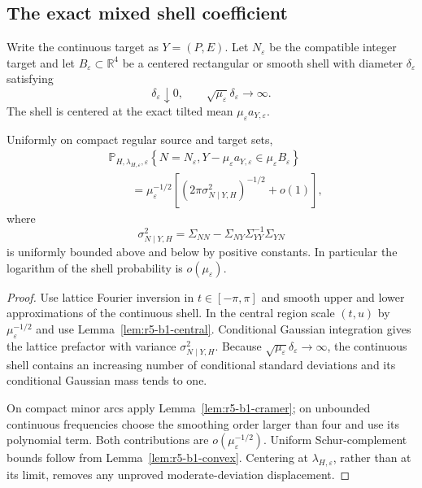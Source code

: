 \subsection{The exact mixed shell coefficient}

Write the continuous target as
\(Y=(P,E)\).  Let \(N_\varepsilon\) be the compatible integer target and let
\(B_\varepsilon\subset\mathbb R^4\) be a centered rectangular or smooth shell
with diameter \(\delta_\varepsilon\) satisfying
\[
 \delta_\varepsilon\downarrow0,
 \qquad \sqrt{\mu_\varepsilon}\delta_\varepsilon\to\infty.
\]
The shell is centered at the exact tilted mean
\(\mu_\varepsilon a_{Y,\varepsilon}\).

\begin{theorem}
\label{thm:r5-b1-coefficient}
Uniformly on compact regular source and target sets,
\[
 \begin{aligned}
 &\mathbb P_{H,\lambda_{H,\varepsilon},\varepsilon}
 \left\{
  N=N_\varepsilon,
  Y-\mu_\varepsilon a_{Y,\varepsilon}\in
  \mu_\varepsilon B_\varepsilon
 \right\}\\
 &\qquad=
 \mu_\varepsilon^{-1/2}
 \left[
  (2\pi\sigma_{N\mid Y,H}^2)^{-1/2}+o(1)
 \right],
 \end{aligned}
\]
where
\[
 \sigma_{N\mid Y,H}^2
 =\Sigma_{NN}-\Sigma_{NY}\Sigma_{YY}^{-1}\Sigma_{YN}
\]
is uniformly bounded above and below by positive constants.  In particular
the logarithm of the shell probability is
\(o(\mu_\varepsilon)\).
\end{theorem}

\begin{proof}
Use lattice Fourier inversion in \(t\in[-\pi,\pi]\) and smooth upper and lower
approximations of the continuous shell.  In the central region scale
\((t,u)\) by \(\mu_\varepsilon^{-1/2}\) and use
Lemma~\ref{lem:r5-b1-central}.  Conditional Gaussian integration gives the
lattice prefactor with variance \(\sigma_{N\mid Y,H}^2\).  Because
\(\sqrt{\mu_\varepsilon}\delta_\varepsilon\to\infty\), the continuous shell
contains an increasing number of conditional standard deviations and its
conditional Gaussian mass tends to one.

On compact minor arcs apply Lemma~\ref{lem:r5-b1-cramer}; on unbounded
continuous frequencies choose the smoothing order larger than four and use
its polynomial term.  Both contributions are
\(o(\mu_\varepsilon^{-1/2})\).  Uniform Schur-complement bounds follow from
Lemma~\ref{lem:r5-b1-convex}.  Centering at
\(\lambda_{H,\varepsilon}\), rather than at its limit, removes any unproved
moderate-deviation displacement.
\end{proof}

